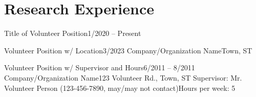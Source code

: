 
\section{Research Experience}
  \resumeSubHeadingListStart

    \resumeSubheadingShort
      {Title of Volunteer Position}{1/2020 -- Present}
      \resumeItemListStart
      \resumeItemListEnd
      
    \resumeSubheading
      {Volunteer Position w/ Location}{3/2023}
      {Company/Organization Name}{Town, ST}
      \resumeItemListStart
      \resumeItemListEnd
 
    \resumeSubheadingWork
      {Volunteer Position w/ Supervisor and Hours}{6/2011 -- 8/2011}
      {Company/Organization Name}{123 Volunteer Rd., Town, ST}
      {Supervisor: Mr. Volunteer Person (123-456-7890, may/may not contact)}{Hours per week: 5}
      \resumeItemListStart
      \resumeItemListEnd
      
  \resumeSubHeadingListEnd
